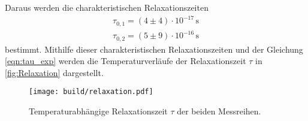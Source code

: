 Daraus werden die charakteristischen Relaxationszeiten
\begin{align*}
    \tau_{0,1} = \left(4\pm4\right)\cdot 10^{-17}\,\si{\second}\\
    \tau_{0,2} = \left(5\pm9\right)\cdot 10^{-16}\,\si{\second}
\end{align*}
bestimmt.
Mithilfe dieser charakteristischen Relaxationszeiten und der Gleichung \ref{eqn:tau_exp} werden die Temperaturverläufe der Relaxationszeit $\tau$ in \autoref{fig:Relaxation} dargestellt.

\begin{figure}
    \centering
    \texttt{[image: build/relaxation.pdf]}
    \caption{Temperaturabhängige Relaxationszeit $\tau$ der beiden Messreihen.}
    \label{fig:Relaxation}
\end{figure}
